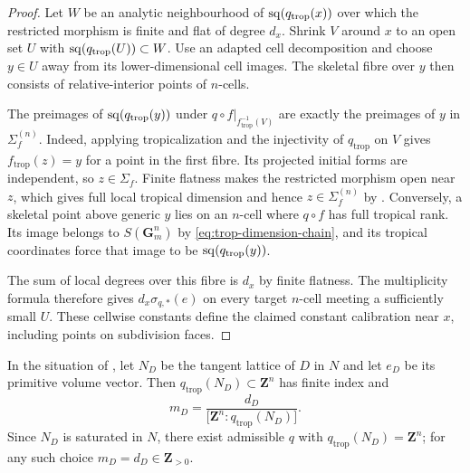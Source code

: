 \begin{proof}
Let $W$ be an analytic neighbourhood of $\operatorname{sq}(q_{\mathrm{trop}}(x))$
over which the restricted morphism is finite and flat of degree $d_x$.
Shrink $V$ around $x$ to an open set $U$ with
$\operatorname{sq}(q_{\mathrm{trop}}(U))\subset W$. Use an adapted cell decomposition
and choose $y\in U$ away from its lower-dimensional cell images. The
skeletal fibre over $y$ then consists of relative-interior points of
$n$-cells.

The preimages of $\operatorname{sq}(q_{\mathrm{trop}}(y))$ under
$q\circ f|_{f_{\mathrm{trop}}^{-1}(V)}$ are exactly the preimages of $y$ in
$\Sigma_f^{(n)}$. Indeed, applying tropicalization and the injectivity of
$q_{\mathrm{trop}}$ on $V$ gives $f_{\mathrm{trop}}(z)=y$ for a point in
the first fibre. Its projected initial forms are independent, so
$z\in\Sigma_f$. Finite flatness makes the restricted morphism open near
$z$, which gives full local tropical dimension and hence
$z\in\Sigma_f^{(n)}$ by .
Conversely, a skeletal point above generic $y$ lies on an $n$-cell where
$q\circ f$ has full tropical rank. Its image belongs to
$S(\mathbf G_m^n)$ by \eqref{eq:trop-dimension-chain}, and its tropical
coordinates force that image to be $\operatorname{sq}(q_{\mathrm{trop}}(y))$.

The sum of local degrees over this fibre is $d_x$ by finite flatness.
The multiplicity formula therefore gives
$d_x\sigma_{q,*}(e)$ on every target $n$-cell meeting a sufficiently small
$U$. These cellwise constants define the claimed constant calibration
near $x$, including points on subdivision faces.
\end{proof}

\begin{corollary}
\label{cor:trop-weights-integral}
In the situation of , let $N_D$ be the
tangent lattice of $D$ in $N$ and let $e_D$ be its primitive volume vector.
Then $q_{\mathrm{trop}}(N_D)\subset\mathbf Z^n$ has finite index and
\begin{equation}
\label{eq:trop-weight-index}
 m_D=\frac{d_D}{\bigl[\mathbf Z^n:q_{\mathrm{trop}}(N_D)\bigr]} .
\end{equation}
Since $N_D$ is saturated in $N$, there exist admissible $q$ with
$q_{\mathrm{trop}}(N_D)=\mathbf Z^n$; for any such choice
$m_D=d_D\in\mathbf Z_{>0}$.
\end{corollary}

